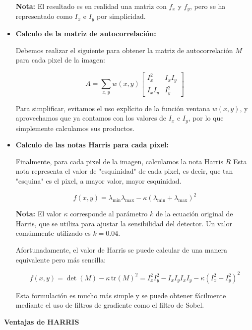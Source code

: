 \documentclass[a4paper]{article}
\begin{document}
\begin{itemize}
        \textbf{Nota:} El resultado es en realidad una matriz con \(f_x\) y \(f_y\), pero se ha representado como \(I_x\) e \(I_y\) por simplicidad.

      
      \item \textbf{Calculo de la matriz de autocorrelación:}  
      
      Debemos realizar el siguiente para obtener la matriz de autocorrelación \(M\) para cada pixel de la imagen:

            \[
        A = \sum_{x, y} w(x, y)
        \begin{bmatrix}
        I_x^2 & I_x I_y \\
        I_x I_y & I_y^2
        \end{bmatrix}
        \]

        Para simplificar, evitamos el uso explícito de la función ventana \(w(x, y)\), y aprovechamos que ya contamos con los valores de \(I_x\) e \(I_y\), por lo que simplemente calculamos sus productos.

        \item \textbf{Calculo de las notas Harris para cada pixel:} 
    
        Finalmente, para cada pixel de la imagen, calculamos la nota Harris \(R\) Esta nota representa
        el valor de "esquinidad" de cada pixel, es decir, que tan "esquina" es el pixel, a mayor valor, mayor esquinidad.

        \[
        f(x, y) = \lambda_{\text{min}} \lambda_{\text{max}} - \kappa (\lambda_{\text{min}} + \lambda_{\text{max}})^2
        \]

        \textbf{Nota:} El valor \(\kappa\) corresponde al parámetro \(k\) de la ecuación original de Harris, que se utiliza para ajustar la sensibilidad del detector. Un valor comúnmente utilizado es \(k = 0.04\).

        Afortunadamente, el valor de Harris se puede calcular de una manera equivalente pero más sencilla:

        \[
        f(x, y) = \det(M) - \kappa \, \text{tr}(M)^2 = I_x^2 I_y^2 - I_xI_y I_xI_y - \kappa (I_x^2 + I_y^2)^2
        \]

    Esta formulación es mucho más simple y se puede obtener fácilmente mediante el uso de filtros de gradiente como el filtro de Sobel.

  \end{itemize}

  \par\vspace{0.5cm}
  \textbf{Ventajas de HARRIS}
  \par\vspace{0.5cm}
  
\end{document}
